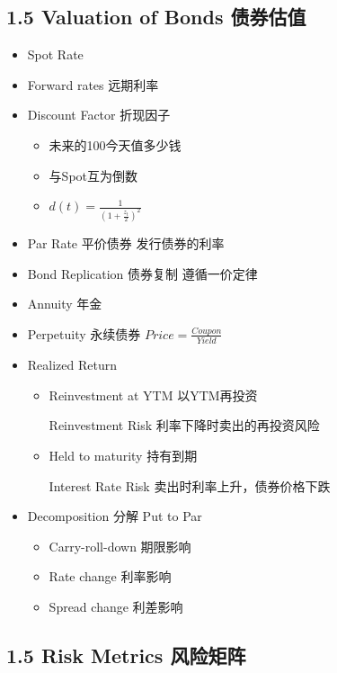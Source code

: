 \documentclass[a4paper,6pt,twoside,openany]{article}
\begin{document}
\subsection*{1.5 Valuation of Bonds 债券估值}
\begin{itemize}
\item Spot Rate
\item Forward rates 远期利率
\item Discount Factor 折现因子
  \begin{itemize}
  \item 未来的100今天值多少钱
  \item 与Spot互为倒数
  \item $d(t) =\frac{1}{(1 + \frac{z_t}{2})^2}$
  \end{itemize}
\item Par Rate 平价债券 发行债券的利率
\item Bond Replication 债券复制 遵循一价定律
\item Annuity 年金
\item Perpetuity 永续债券  $Price = \frac{Coupon}{Yield}$
\item Realized Return
  \begin{itemize}
  \item Reinvestment at YTM 以YTM再投资
    \par Reinvestment Risk 利率下降时卖出的再投资风险
  \item Held to maturity 持有到期
    \par Interest Rate Risk 卖出时利率上升，债券价格下跌
  \end{itemize}
\item Decomposition 分解 Put to Par
  \begin{itemize}
  \item Carry-roll-down 期限影响
  \item Rate change 利率影响
  \item Spread change 利差影响
  \end{itemize}
\end{itemize}

\subsection*{1.5 Risk Metrics 风险矩阵}
\end{document}
